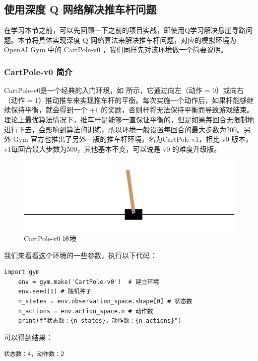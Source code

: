 \subsection{使用深度 Q 网络解决推车杆问题}

在学习本节之前，可以先回顾一下之前的项目实战，即使用Q学习解决悬崖寻路问题。本节将具体实现深度 Q 网络算法来解决推车杆问题，对应的模拟环境为 OpenAI Gym 中的 CartPole-v0 ，我们同样先对该环境做一个简要说明。

\subsubsection{CartPole-v0 简介} 

CartPole-v0是一个经典的入门环境，如 所示，它通过向左（动作 = 0）或向右（动作 = 1）推动推车来实现推车杆的平衡。每次实施一个动作后，如果杆能够继续保持平衡，就会得到一个 $+1$ 的奖励，否则杆将无法保持平衡而导致游戏结束。理论上最优算法情况下，推车杆是能够一直保证平衡的，但是如果每回合无限制地进行下去，会影响到算法的训练，所以环境一般设置每回合的最大步数为200。另外 Gym 官方也推出了另外一版的推车杆环境，名为CartPole-v1，相比 v0 版本，v1每回合最大步数为500，其他基本不变，可以说是 v0 的难度升级版。

\begin{figure}[htb]
    \centering
    \includegraphics[width=0.6\linewidth]{res/ch7/assets/poster.jpg}
    \caption{CartPole-v0 环境}
    \label{fig:cliffwalking}
\end{figure}

我们来看看这个环境的一些参数，执行以下代码：

\begin{lstlisting}[style=Python]
    import gym
    env = gym.make('CartPole-v0')  # 建立环境
    env.seed(1) # 随机种子
    n_states = env.observation_space.shape[0] # 状态数
    n_actions = env.action_space.n # 动作数
    print(f"状态数：{n_states}，动作数：{n_actions}")
\end{lstlisting}

可以得到结果：

\begin{lstlisting}[language=sh,basicstyle=\zihao{-5}\ttfamily] 
    状态数：4，动作数：2
\end{lstlisting}

